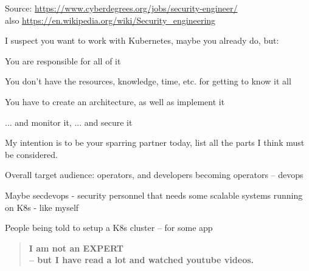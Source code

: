 \documentclass[Screen16to9,17pt]{foils}
\begin{document}
Source: \url{https://www.cyberdegrees.org/jobs/security-engineer/}\\
also
\url{https://en.wikipedia.org/wiki/Security_engineering}





I suspect you want to work with Kubernetes, maybe you already do, but:
\begin{list2}
\item You are responsible for all of it
\item You don't have the resources, knowledge, time, etc. for getting to know it all
\item You have to create an architecture, as well as implement it
\item ... and monitor it, ... and secure it
\end{list2}
My intention is to be your sparring partner today, list all the parts I think must be considered.



\begin{quote}

\end{quote}

\begin{list2}
\item Overall target audience: operators, and developers becoming operators -- devops
\item Maybe secdevops - security personnel that needs some scalable systems running on K8s
    - like myself
\item People being told to setup a K8s cluster -- for some app
\end{list2}



\begin{quote}
\large \bf I am not an EXPERT \\
-- but I have read a lot and watched youtube videos. \smiley
\end{quote}
\end{document}
